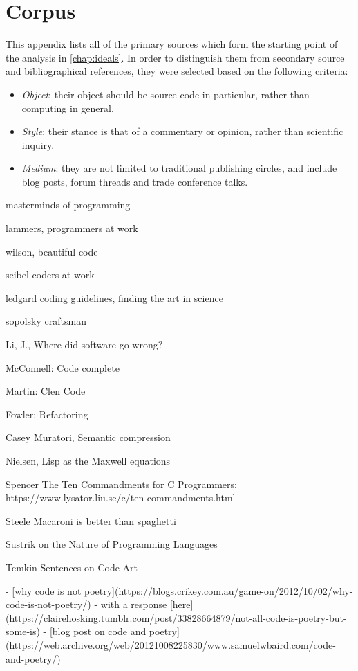 \chapter{Corpus}
\label{appendix:corpus}

This appendix lists all of the primary sources which form the starting point of the analysis in \autoref{chap:ideals}. In order to distinguish them from secondary source and bibliographical references, they were selected based on the following criteria:

\begin{itemize}
    \item \emph{Object}: their object should be source code in particular, rather than computing in general.
    \item \emph{Style}: their stance is that of a commentary or opinion, rather than scientific inquiry.
    \item \emph{Medium}: they are not limited to traditional publishing circles, and include blog posts, forum threads and trade conference talks.
\end{itemize}

masterminds of programming

lammers, programmers at work

wilson, beautiful code

seibel coders at work

ledgard coding guidelines, finding the art in science

sopolsky craftsman

Li, J., Where did software go wrong?

McConnell: Code complete

Martin: Clen Code

Fowler: Refactoring

Casey Muratori, Semantic compression

Nielsen, Lisp as the Maxwell equations

Spencer The Ten Commandments for C Programmers: https://www.lysator.liu.se/c/ten-commandments.html

Steele Macaroni is better than spaghetti

Sustrik on the Nature of Programming Languages

Temkin Sentences on Code Art


- [why code is not poetry](https://blogs.crikey.com.au/game-on/2012/10/02/why-code-is-not-poetry/) - with a response [here](https://clairehosking.tumblr.com/post/33828664879/not-all-code-is-poetry-but-some-is)
- [blog post on code and poetry](https://web.archive.org/web/20121008225830/www.samuelwbaird.com/code-and-poetry/)

